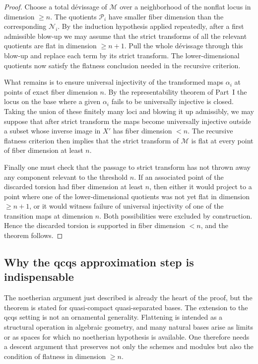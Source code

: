 \documentclass[11pt,oneside]{article}
\newcommand{\M}{\mathcal M}
\newcommand{\N}{\mathcal N}
\newcommand{\Pcal}{\mathcal P}
\begin{document}
\begin{proof}
Choose a total d\'evissage of $\M$ over a neighborhood of the nonflat locus in dimension $\ge n$.  The quotients $\Pcal_i$ have smaller fiber dimension than the corresponding $\N_i$.  By the induction hypothesis applied repeatedly, after a first admissible blow-up we may assume that the strict transforms of all the relevant quotients are flat in dimension $\ge n+1$.  Pull the whole d\'evissage through this blow-up and replace each term by its strict transform.  The lower-dimensional quotients now satisfy the flatness conclusion needed in the recursive criterion.

What remains is to ensure universal injectivity of the transformed maps $\alpha_i$ at points of exact fiber dimension $n$.  By the representability theorem of Part~I the locus on the base where a given $\alpha_i$ fails to be universally injective is closed.  Taking the union of these finitely many loci and blowing it up admissibly, we may suppose that after strict transform the maps become universally injective outside a subset whose inverse image in $X'$ has fiber dimension $<n$.  The recursive flatness criterion then implies that the strict transform of $\M$ is flat at every point of fiber dimension at least $n$.

Finally one must check that the passage to strict transform has not thrown away any component relevant to the threshold $n$.  If an associated point of the discarded torsion had fiber dimension at least $n$, then either it would project to a point where one of the lower-dimensional quotients was not yet flat in dimension $\ge n+1$, or it would witness failure of universal injectivity of one of the transition maps at dimension $n$.  Both possibilities were excluded by construction.  Hence the discarded torsion is supported in fiber dimension $<n$, and the theorem follows.
\end{proof}

\subsection{Why the qcqs approximation step is indispensable}

The noetherian argument just described is already the heart of the proof, but the theorem is stated for quasi-compact quasi-separated bases.  The extension to the qcqs setting is not an ornamental generality.  Flattening is intended as a structural operation in algebraic geometry, and many natural bases arise as limits or as spaces for which no noetherian hypothesis is available.  One therefore needs a descent argument that preserves not only the schemes and modules but also the condition of flatness in dimension $\ge n$.
\end{document}
